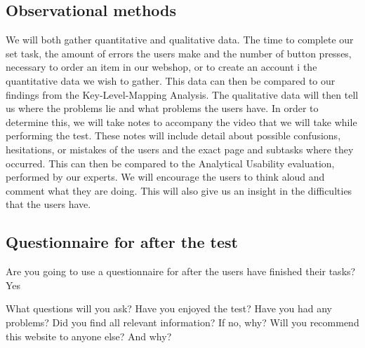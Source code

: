 \subsection{Observational methods}
We will both gather quantitative and qualitative data.  The time to complete our set task, the amount of errors the users make and the number of button presses, necessary to order an item in our webshop, or to create an account i the quantitative data we wish to gather. This data can then be compared to our findings from the Key-Level-Mapping Analysis. The qualitative data will then tell us where the problems lie and what problems the users have. In order to determine this, we will take notes to accompany the video that we will take while performing the test. These notes will include detail about possible confusions, hesitations, or mistakes of the users and the exact page and subtasks where they occurred. This can then be compared to the Analytical Usability evaluation, performed by our experts.
We will encourage the users to think aloud and comment what they are doing. This will also give us an insight in the difficulties that the users have.

\subsection{Questionnaire for after the test}
Are you going to use a questionnaire for after the users have finished their tasks?
Yes


What questions will you ask? 
Have you enjoyed the test?
Have you had any problems?
Did you find all relevant information? If no, why?
Will you recommend this website to anyone else? And why?


